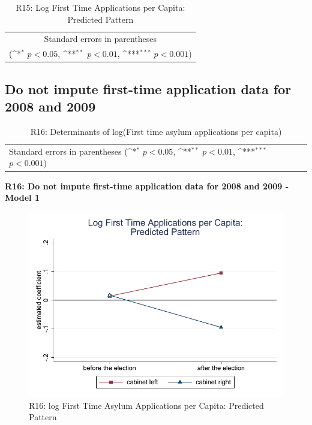 \documentclass[10pt,a4paper]{scrartcl}
\begin{document}
\begin{table}[!ht]\centering
	\footnotesize
	\renewcommand{\arraystretch}{1.2}
	\def\sym#1{\ifmmode^{#1}\else\(^{#1}\)\fi}
	\caption{R15: Log First Time Applications per Capita: Predicted Pattern}
	\begin{tabular}{l*{2}{c}}
		\hline\hline
		
		\hline\hline
		\multicolumn{3}{c}{\footnotesize Standard errors in parentheses} \\
		\multicolumn{3}{c}{\footnotesize (\sym{*} \(p<0.05\), \sym{**} \(p<0.01\), \sym{***} \(p<0.001\))} \\
	\end{tabular}
\end{table}





\clearpage
\FloatBarrier
\subsection{Do not impute first-time application data for 2008 and 2009}
\begin{table}[!ht]\centering
	\renewcommand{\arraystretch}{1.25}
	\small
	\def\sym#1{\ifmmode^{#1}\else\(^{#1}\)\fi}
	\caption{R16: Determinants of log(First time asylum applications per capita)}
	\begin{tabular}{l*{3}{c}}
		\hline\hline
		
		\hline\hline
		\multicolumn{4}{l}{\footnotesize Standard errors in parentheses (\sym{*} \(p<0.05\), \sym{**} \(p<0.01\), \sym{***} \(p<0.001\))}\\
	\end{tabular}
\end{table}

\clearpage
\textbf{R16: Do not impute first-time application data for 2008 and 2009 - Model 1}
\begin{figure}[!ht]
	\centering
	\includegraphics[width=1\textwidth]{figures_edited/app_graph1_R16.pdf}
	\caption{R16: log First Time Asylum Applications per Capita: Predicted Pattern}
\end{figure}
\end{document}
